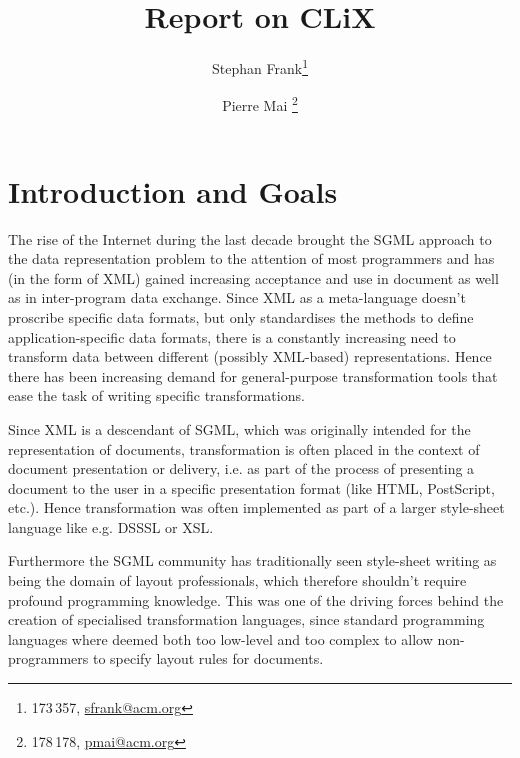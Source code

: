 \documentclass[a4paper,11pt]{scrartcl}
\begin{document}
\title{Report on CLiX}
\author{Stephan Frank\thanks{173\,357, \protect\url{sfrank@acm.org}}
  \and
  Pierre Mai \thanks{178\,178, \protect\url{pmai@acm.org}}}
\maketitle
\tableofcontents

\section{Introduction and Goals}

The rise of the Internet during the last decade brought the SGML
approach to the data representation problem to the attention of most
programmers and has (in the form of XML) gained increasing acceptance
and use in document as well as in inter-program data exchange.
Since XML as a meta-language doesn't proscribe specific data formats,
but only standardises the methods to define application-specific data
formats, there is a constantly increasing need to transform data
between different (possibly XML-based) representations.  Hence there
has been increasing demand for general-purpose transformation tools
that ease the task of writing specific transformations.

Since XML is a descendant of SGML, which was originally intended for
the representation of documents, transformation is often placed in the
context of document presentation or delivery, i.e. as part of the
process of presenting a document to the user in a specific
presentation format (like HTML, PostScript, etc.).  Hence
transformation was often implemented as part of a larger style-sheet
language like e.g. DSSSL or XSL.

Furthermore the SGML community has traditionally seen style-sheet
writing as being the domain of layout professionals, which therefore
shouldn't require profound programming knowledge. This was one of the
driving forces behind the creation of specialised transformation
languages, since standard programming languages where deemed both too
low-level and too complex to allow non-programmers to specify layout
rules for documents.
\end{document}
